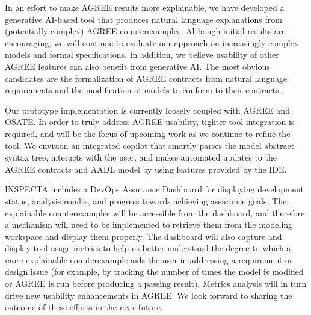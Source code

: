 
In an effort to make AGREE results more explainable, we have developed a generative AI-based tool that produces natural language explanations from (potentially complex) AGREE counterexamples. 
%
%
Although initial results are encouraging, we will continue to evaluate our approach on increasingly complex models and formal specifications.  In addition, we believe usability of other AGREE features can also benefit from generative AI.  The most obvious candidates are the formalization of AGREE contracts from natural language requirements and the modification of models to conform to their contracts.   

Our prototype implementation is currently loosely coupled with AGREE and OSATE.  In order to truly address AGREE usability, tighter tool integration is required, and will be the focus of upcoming work as we continue to refine the tool.  We envision an integrated copilot that smartly parses the model abstract syntax tree, interacts with the user, and makes automated updates to the AGREE contracts and AADL model by using features provided by the IDE.

INSPECTA includes a DevOps Assurance Dashboard for displaying development status, analysis results, and progress towards achieving assurance goals.  The explainable counterexamples will be accessible from the dashboard, and therefore a mechanism will need to be implemented to retrieve them from the modeling workspace and display them properly.
The dashboard will also capture and display tool usage metrics to help us better understand the degree to which a more explainable counterexample aids the user in addressing a requirement or design issue (for example, by tracking the number of times the model is modified or AGREE is run before producing a passing result). Metrics analysis will in turn drive new usability enhancements in AGREE.
%
We look forward to sharing the outcome of these efforts in the near future.